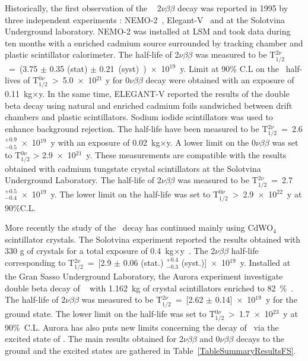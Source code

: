 \documentclass[main.tex]{subfiles}
\begin{document}
\bigskip


\NI Historically, the first observation of the \Cd~ 2$\nu\beta\beta$ decay was reported in 1995 by three independent experiments : NEMO-2~\cite{Barabash2010ie}, Elegant-V~\cite{ElegantV-1} and at the Solotvina Underground laboratory\cite{Aurora}. NEMO-2 was installed at LSM and took data during ten months with a enriched cadmium source surrounded by tracking chamber and plastic scintillator calorimeter. The half-life of 2$\nu\beta\beta$ was measured to be T$_{\text{1}/\text{2}}^{\text{2}\nu}$~=~(3.75 $\pm$ 0.35 (stat) $\pm$ 0.21~(syst)~)~$\times$~10$^{\text{19}}$~y. Limit at 90\% C.L on the \Cd~half-lives of T$_{\text{1}/\text{2}}^{\text{0}\nu}$~>~5.0~$\times$~10$^{\text{21}}$ y for 0$\nu\beta\beta$ decay were obtained with an exposure of 0.11~kg$\times$y. In the same time, ELEGANT-V reported the results of the double beta decay using natural and enriched cadmium foils sandwiched between drift chambers and plastic scintillators. Sodium iodide scintillators was used to enhance background rejection. The half-life have been measured to be T$_{\text{1}/\text{2}}^{\text{2}\nu}$~=~2.6 $^{+\text{0.9}}_{-\text{0.5}}$~$\times$~10$^{\text{19}}$~y with an exposure of 0.02~kg$\times$y. A lower limit on the 0$\nu\beta\beta$ was set to T$_{\text{1}/\text{2}}^{\text{0}\nu}$ > 2.9~$\times$~10$^{\text{21}}$~y. These measurements are compatible with the results obtained with cadmium tungstate crystal scintillators at the Solotvina Underground Laboratory.  The half-life of 2$\nu\beta\beta$ was measured to be T$_{\text{1}/\text{2}}^{\text{2}\nu}$~=~2.7$^{+\text{0.5}}_{-\text{0.4}}$~$\times$~10$^{\text{19}}$~y. The lower limit on the half-life was set to T$_{\text{1}/\text{2}}^{\text{0}\nu}$~>~2.9~$\times$~10$^{\text{22}}$~y at 90\%C.L. 


\bigskip


\NI More recently the study of the \Cd~decay has continued mainly using CdWO$_{\text{4}}$ scintillator crystals. The Solotvina experiment reported the results obtained with 330 g of crystals for a total exposure  of 0.4~kg$\times$y~\cite{Solotvina}. The 2$\nu\beta\beta$ half-life corresponding to T$_{\text{1}/\text{2}}^{\text{2}\nu}$~=~[2.9 $\pm$ 0.06 (stat.) $^{+\text{0.4}}_{-\text{0.3}}$ (syst.)]~$\times$~10$^{\text{19}}$~y. Installed at the Gran Sasso Underground Laboratory, the Aurora experiment investigate double beta decay of \Cd~ with 1.162~kg of crystal scintillators enriched to 82~\%~\cite{Aurora}. The half-life of 2$\nu\beta\beta$ was measured to be T$_{\text{1}/\text{2}}^{\text{2}\nu}$~=~[2.62 $\pm$ 0.14]~$\times$~10$^{\text{19}}$~y for the ground state. The lower limit on the half-life was set to T$_{\text{1}/\text{2}}^{\text{0}\nu}$~>~1.7~$\times$~10$^{\text{23}}$~y at 90\%~C.L. Aurora has also puts new limits concerning the decay of \Cd~via the excited state of \Sn. The main results obtained for 2$\nu\beta\beta$ and 0$\nu\beta\beta$ decays to the ground and the excited states are gathered in Table~\ref{TableSummaryResultsFS}.
\end{document}
